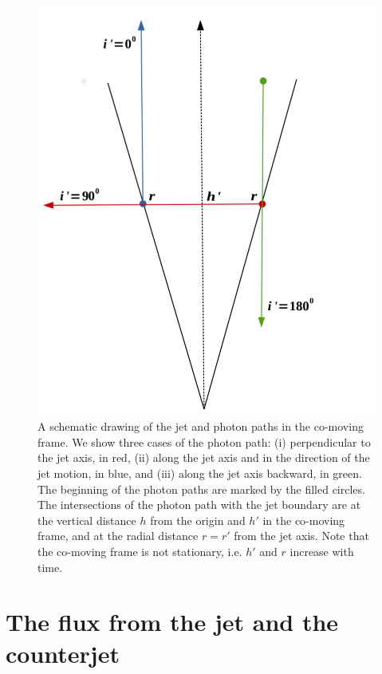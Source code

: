 \begin{figure}
\noindent \centering{}\includegraphics[scale=0.68]{emission_angles.pdf}\caption{A schematic drawing of the jet and photon paths in the co-moving frame. We show three cases of the photon path: (i) perpendicular to the jet axis, in red, (ii) along the jet axis and in the direction of the jet motion, in blue, and (iii) along the jet axis backward, in green. The beginning of the photon paths are marked by the filled circles. The intersections of the photon path with the jet boundary are at the vertical distance $ h $ from the origin and $ h' $ in the co-moving frame, and at the radial distance $ r = r' $ from the jet axis. Note that the co-moving frame is not stationary, i.e. $ h' $ and $ r $ increase with time.}
\label{fig:The_emission_angles}
\end{figure}


\section{The flux from the jet and the counterjet} \label{sec:flux_calculation}

